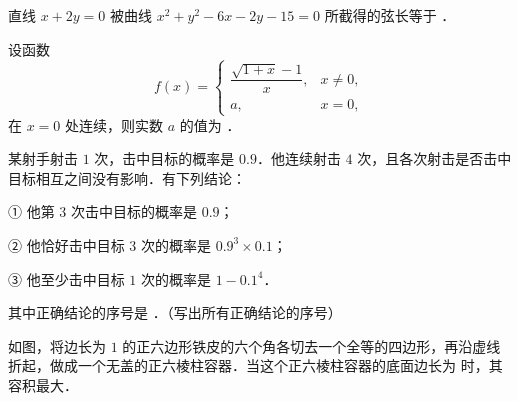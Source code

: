 \begin{question}
直线 $x + 2y = 0$ 被曲线 $x^2 + y^2 - 6x - 2y - 15 = 0$ 所截得的弦长等于 \underline{\hspace{3cm}}．

\end{question}
\begin{question}
设函数
\nopagebreak[4]
\[
f(x) = \begin{cases} \dfrac{\sqrt{1+x}-1}{x}, & x \neq 0, \\ a, & x = 0, \end{cases}
\]
在 $x = 0$ 处连续，则实数 $a$ 的值为 \underline{\hspace{3cm}}．

\end{question}
\begin{question}
某射手射击 $1$ 次，击中目标的概率是 $0.9$．他连续射击 $4$ 次，且各次射击是否击中目标相互之间没有影响．有下列结论：

① 他第 $3$ 次击中目标的概率是 $0.9$；

② 他恰好击中目标 $3$ 次的概率是 $0.9^3 \times 0.1$；

③ 他至少击中目标 $1$ 次的概率是 $1 - 0.1^4$．

其中正确结论的序号是 \underline{\hspace{3cm}}．（写出所有正确结论的序号）

\Needspace{0.4\textheight}
\end{question}
\begin{question}
如图，将边长为 $1$ 的正六边形铁皮的六个角各切去一个全等的四边形，再沿虚线折起，做成一个无盖的正六棱柱容器．当这个正六棱柱容器的底面边长为 \underline{\hspace{3cm}} 时，其容积最大．
\nopagebreak[4]
\begin{center}\end{center}
\nopagebreak[4]
\end{question}

